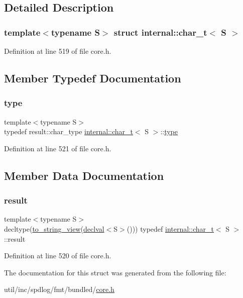 \subsection{Detailed Description}
\subsubsection*{template$<$typename S$>$\newline
struct internal\+::char\+\_\+t$<$ S $>$}



Definition at line 519 of file core.\+h.



\subsection{Member Typedef Documentation}
\mbox{\label{structinternal_1_1char__t_a2c8d562d0da17ea0c810a6cd7dbb2981}} 
\subsubsection{\texorpdfstring{type}{type}}
{\footnotesize\ttfamily template$<$typename S$>$ \\
typedef result\+::char\+\_\+type \hyperlink{structinternal_1_1char__t}{internal\+::char\+\_\+t}$<$ S $>$\+::\hyperlink{structinternal_1_1char__t_a2c8d562d0da17ea0c810a6cd7dbb2981}{type}}



Definition at line 521 of file core.\+h.



\subsection{Member Data Documentation}
\mbox{\label{structinternal_1_1char__t_a9014c6328d3190e6cb5869962aa8c3f2}} 
\subsubsection{\texorpdfstring{result}{result}}
{\footnotesize\ttfamily template$<$typename S$>$ \\
decltype(\hyperlink{namespaceinternal_a153fda3826e43649ab74f70396f9d5bc}{to\+\_\+string\+\_\+view}(\hyperlink{namespaceinternal_a5f61aadb1d6afc8b79ef7ea57c39eafc}{declval}$<$S$>$())) typedef \hyperlink{structinternal_1_1char__t}{internal\+::char\+\_\+t}$<$ S $>$\+::result}



Definition at line 520 of file core.\+h.



The documentation for this struct was generated from the following file\+:\begin{DoxyCompactItemize}
\item 
util/inc/spdlog/fmt/bundled/\hyperlink{core_8h}{core.\+h}\end{DoxyCompactItemize}
